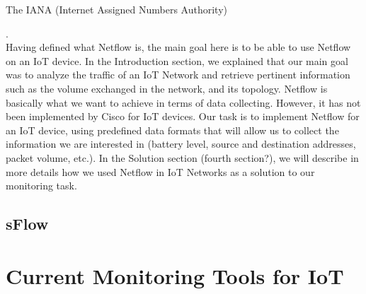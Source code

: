 The IANA (Internet Assigned Numbers Authority)

.\\

Having defined what Netflow is, the main goal here is to be able to use Netflow on an IoT device. In the Introduction section, we explained that our main goal was to analyze the traffic of an IoT Network and retrieve pertinent information such as the volume exchanged in the network, and its topology. Netflow is basically what we want to achieve in terms of data collecting. However, it has not been implemented by Cisco for IoT devices. Our task is to implement Netflow for an IoT device, using predefined data formats that will allow us to collect the information we are interested in (battery level, source and destination addresses, packet volume, etc.). In the Solution section (fourth section?), we will describe in more details how we used Netflow in IoT Networks as a solution to our monitoring task.

\section{sFlow}

\chapter{Current Monitoring Tools for IoT}
